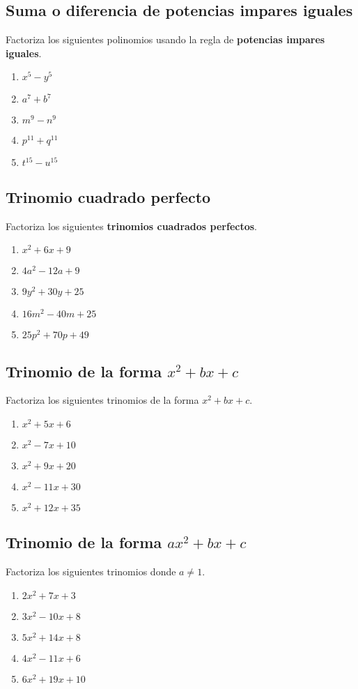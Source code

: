 \documentclass{profesor}
\begin{document}
\subsection{Suma o diferencia de potencias impares iguales}
Factoriza los siguientes polinomios usando la regla de \textbf{potencias impares iguales}.
\begin{enumerate}
    \item $x^5 - y^5$
    \item $a^7 + b^7$
    \item $m^9 - n^9$
    \item $p^{11} + q^{11}$
    \item $t^{15} - u^{15}$
\end{enumerate}

\subsection{Trinomio cuadrado perfecto}
Factoriza los siguientes \textbf{trinomios cuadrados perfectos}.
\begin{enumerate}
    \item $x^2 + 6x + 9$
    \item $4a^2 - 12a + 9$
    \item $9y^2 + 30y + 25$
    \item $16m^2 - 40m + 25$
    \item $25p^2 + 70p + 49$
\end{enumerate}

\subsection{Trinomio de la forma \(x^2 + bx + c\)}
Factoriza los siguientes trinomios de la forma \(x^2 + bx + c\).
\begin{enumerate}
    \item $x^2 + 5x + 6$
    \item $x^2 - 7x + 10$
    \item $x^2 + 9x + 20$
    \item $x^2 - 11x + 30$
    \item $x^2 + 12x + 35$
\end{enumerate}

\subsection{Trinomio de la forma \(ax^2 + bx + c\)}
Factoriza los siguientes trinomios donde \(a \neq 1\).
\begin{enumerate}
    \item $2x^2 + 7x + 3$
    \item $3x^2 - 10x + 8$
    \item $5x^2 + 14x + 8$
    \item $4x^2 - 11x + 6$
    \item $6x^2 + 19x + 10$
\end{enumerate}
\end{document}
